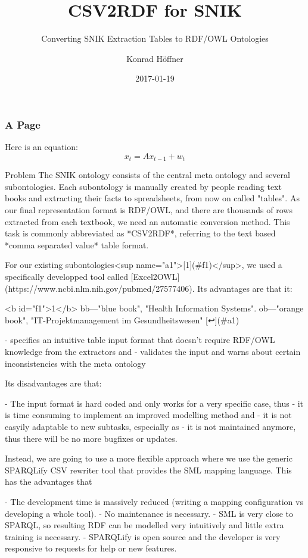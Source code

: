 \documentclass{beamer}
\author{Konrad Höffner}
\date{2017-01-19}
\title{CSV2RDF for SNIK}
\subtitle{Converting SNIK Extraction Tables to RDF/OWL Ontologies}
\begin{document}
\begin{frame}
\titlepage
\end{frame}

\begin{frame}[fragile]
\frametitle{A Page}
Here is an equation:
\begin{equation}
x_t = Ax_{t-1} + w_t
\end{equation}
\end{frame}

\begin{frame}{Problem}
The SNIK ontology consists of the central meta ontology and several subontologies.
Each subontology is manually created by people reading text books and extracting their facts to spreadsheets, from now on called "tables".
As our final representation format is RDF/OWL, and there are thousands of rows extracted from each textbook, we need an automatic conversion method. This task is commonly abbreviated as *CSV2RDF*, referring to the text based *comma separated value* table format.
 
\begin{frame}{}
For our existing subontologies<sup name="a1">[1](#f1)</sup>, we used a specifically developped tool called [Excel2OWL](https://www.ncbi.nlm.nih.gov/pubmed/27577406).
Its advantages are that it:

<b id="f1">1</b> bb—"blue book", "Health Information Systems". ob—"orange book", "IT-Projektmanagement im Gesundheitswesen" [↩](#a1)

- specifies an intuitive table input format that doesn't require RDF/OWL knowledge from the extractors and
- validates the input and warns about certain inconsistencies with the meta ontology

Its disadvantages are that:

- The input format is hard coded and only works for a very specific case, thus
- it is time consuming to implement an improved modelling method and
- it is not easyily adaptable to new subtasks, especially as
- it is not maintained anymore, thus there will be no more bugfixes or updates.

Instead, we are going to use a more flexible approach where we use the generic SPARQLify CSV rewriter tool that provides the SML mapping language. This has the advantages that

- The development time is massively reduced (writing a mapping configuration vs developing a whole tool).
- No maintenance is necessary.
- SML is very close to SPARQL, so resulting RDF can be modelled very intuitively and little extra training is necessary.
- SPARQLify is open source and the developer is very responsive to requests for help or new features.


\end{frame}
\end{frame}
\end{document}

